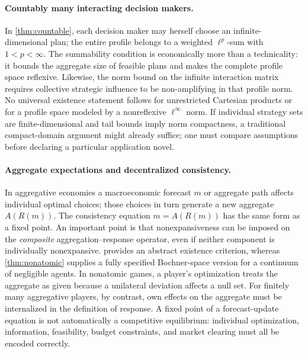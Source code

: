 \documentclass[11pt]{article}
\theoremstyle{definition}\newtheorem{definition}[theorem]{Definition}
\begin{document}
\paragraph{Countably many interacting decision makers.}
In \cref{thm:countable}, each decision maker may herself choose an infinite-dimensional plan; the entire profile belongs to a weighted $\ell^p$-sum with $1<p<\infty$. The summability condition is economically more than a technicality: it bounds the aggregate size of feasible plans and makes the complete profile space reflexive. Likewise, the norm bound on the infinite interaction matrix requires collective strategic influence to be non-amplifying in that profile norm. No universal existence statement follows for unrestricted Cartesian products or for a profile space modeled by a nonreflexive $\ell^\infty$ norm. If individual strategy sets are finite-dimensional and tail bounds imply norm compactness, a traditional compact-domain argument might already suffice; one must compare assumptions before declaring a particular application novel.

\paragraph{Aggregate expectations and decentralized consistency.}
In aggregative economies a macroeconomic forecast $m$ or aggregate path affects individual optimal choices; those choices in turn generate a new aggregate $A(R(m))$. The consistency equation $m=A(R(m))$ has the same form as a fixed point. An important point is that nonexpansiveness can be imposed on the \emph{composite} aggregation--response operator, even if neither component is individually nonexpansive.  provides an abstract existence criterion, whereas \cref{thm:nonatomic} supplies a fully specified Bochner-space version for a continuum of negligible agents. In nonatomic games, a player's optimization treats the aggregate as given because a unilateral deviation affects a null set. For finitely many aggregative players, by contrast, own effects on the aggregate must be internalized in the definition of response. A fixed point of a forecast-update equation is not automatically a competitive equilibrium: individual optimization, information, feasibility, budget constraints, and market clearing must all be encoded correctly.
\end{document}
